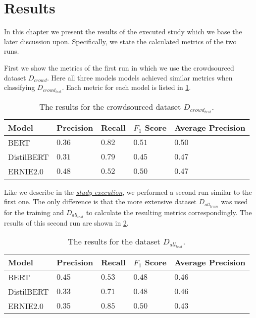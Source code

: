 \section{Results}
\label{chp:study:sec:results}
In this chapter we present the results of the executed study which we base the later discussion upon.
Specifically, we state the calculated metrics of the two runs.

First we show the metrics of the first run in which we use the crowdsourced dataset $D_{crowd}$.
Here all three models models achieved similar metrics when classifying $D_{crowd_{test}}$.
Each metric for each model is listed in \cref{tab:study:results:first_run}.
\begin{table}[htpb]
    \centering
    \begin{tabular}{l l l l l }
        \toprule
         Model & Precision & Recall & $F_1$ Score & Average Precision \\
        \midrule
        \ac{BERT} & $0.36$ & $0.82$ & $0.51$ & $0.50$\\
        \ac{DistilBERT} & $0.31$ & $0.79$ & $0.45$ & $0.47$\\
        \ac{ERNIE2.0} & $0.48$ & $0.52$ & $0.50$ & $0.47$\\
        \bottomrule
    \end{tabular}
    \caption[Study Results on Crowdsourced Dataset]{The results for the crowdsourced dataset $D_{crowd_{test}}$.}\label{tab:study:results:first_run}
\end{table}

Like we describe in the \hyperref[chp:study:sec:execution]{\textit{study execution}}, we performed a second run similar to the first one.
The only difference is that the more extensive dataset $D_{all_{train}}$ was used for the training and $D_{all_{test}}$ to calculate the resulting metrics correspondingly.
The results of this second run are shown in \cref{tab:study:results:second_run}.
\begin{table}[htpb]
    \centering
    \begin{tabular}{l l l l l }
        \toprule
         Model & Precision & Recall & $F_1$ Score & Average Precision\\
        \midrule
        \ac{BERT} & $0.45$ & $0.53$ & $0.48$ & $0.46$\\
        \ac{DistilBERT} & $0.33$ & $0.71$ & $0.48$ & $0.46$\\
        \ac{ERNIE2.0} & $0.35$ & $0.85$ & $0.50$ & $0.43$\\
        \bottomrule
    \end{tabular}
    \caption[Study Results on Complete Dataset]{The results for the dataset $D_{all_{test}}$.}\label{tab:study:results:second_run}
\end{table}
